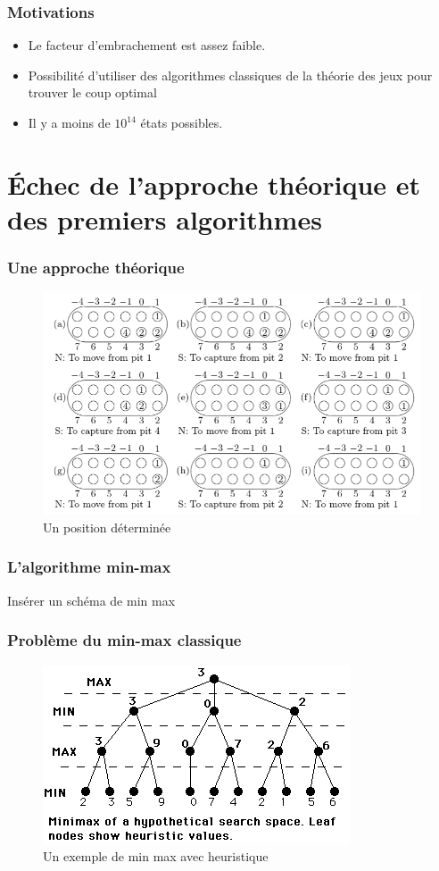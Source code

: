 \documentclass{beamer}
\begin{document}
\begin{frame}
  \frametitle{Motivations}
  \begin{itemize}
  \item Le facteur d'embrachement est assez faible.
  \item Possibilité d'utiliser des algorithmes classiques de la théorie des jeux pour trouver le coup optimal
  \item Il y a moins de $10^{14}$ états possibles.
  \end{itemize}
\end{frame}

\section{Échec de l'approche théorique et des premiers algorithmes}
\begin{frame}
  \frametitle{Une approche théorique}
  \begin{figure}
    \centering
    \includegraphics[width=\linewidth]{ressources/determined_positions.png}
    \caption{Un position déterminée}
  \end{figure}
\end{frame}

\begin{frame}
  \frametitle{L'algorithme min-max}
  Insérer un schéma de min max
\end{frame}


\begin{frame}
  \frametitle{Problème du min-max classique}
  \begin{figure}
    \centering
    \includegraphics[width=0.8\linewidth]{ressources/min_max_heuristique.png}
    \caption{Un exemple de min max avec heuristique}
  \end{figure}
\end{frame}
\end{document}
